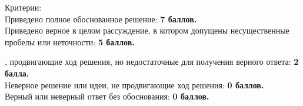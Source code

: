\newpage

\hspace{3mm}

Критерии:\\
Приведено полное обоснованное решение: \textbf{7 баллов.}\\
Приведено верное в целом рассуждение, в котором допущены несущественные пробелы или неточности: \textbf{5 баллов.}

\newpage

\hspace{3mm}

, продвигающие ход решения, но недостаточные для получения верного ответа: \textbf{2 балла.}\\
Неверное решение или идеи, не продвигающие ход решения: \textbf{0 баллов.}\\
Верный или неверный ответ без обоснования: \textbf{0 баллов.}

